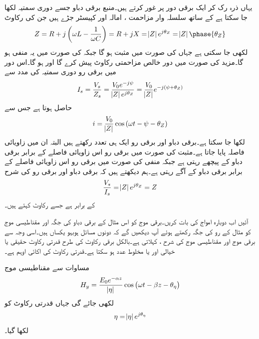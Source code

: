 یہاں ذرہ رک کر ایک برقی دور پر غور کرتے ہیں۔منبع برقی دباو  جسے دوری سمتیہ  لکھا جا سکتا ہے کے ساتھ سلسلہ وار مزاحمت ، امالہ  اور کپیسٹر  جڑے ہیں جن کی رکاوٹ 
\begin{align*}
Z=R+j\left( \omega L -\frac{1}{\omega C}\right)=R+jX=\abs{Z} e^{j \theta_Z}=\abs{Z}\phase{\theta_Z}
\end{align*}
لکھی جا سکتی ہے  جہاں  کی صورت میں  مثبت ہو گا جبکہ  کی صورت میں یہ منفی ہو گا۔مزید  کی صورت میں دور خالص مزاحمتی رکاوٹ پیش کرے گا اور  ہو گا۔اس دور میں برقی رو دوری سمتیہ کی مدد سے
\begin{align*}
I_s=\frac{V_s}{Z_s}=\frac{V_0 e^{-j\psi}}{\abs{Z}e^{j \theta_Z}}=\frac{V_0}{\abs{Z}}e^{-j(\psi+\theta_Z)}
\end{align*}
حاصل ہوتا ہے جس سے
\begin{align*}
i=\frac{V_0}{\abs{Z}}\cos \left(\omega t -\psi-\theta_Z \right)
\end{align*}
لکھا جا سکتا ہے۔برقی دباو اور برقی رو ایک ہی تعدد رکھتے ہیں البتہ ان میں زاویائی فاصلہ  پایا جاتا ہے۔مثبت  کی صورت میں برقی رو اس زاویائی فاصلے کے برابر برقی دباو کے پیچھے رہتی ہے جبکہ منفی  کی صورت میں برقی رو اس زاویائی فاصلے کے برابر برقی دباو کے آگے رہتی ہے۔ہم دیکھتے ہیں کہ برقی دباو اور برقی رو کی شرح
\begin{align*}
\frac{V_s}{I_s}=\abs{Z} e^{j \theta_Z}=Z
\end{align*}
کے برابر ہے جسے رکاوٹ کہتے ہیں۔

آئیں اب دوبارہ امواج کی بات کریں۔برقی موج کو اس مثال کے برقی دباو کی جگہ اور مقناطیسی موج کو مثال کے رو کی جگہ رکھتے ہوئے آپ دیکھیں گے کہ دونوں مسائل ہوبہو یکساں ہیں۔اسی وجہ سے  برقی موج  اور مقناطیسی موج  کی شرح ،   کہلاتی ہے۔بالکل برقی رکاوٹ کی طرح قدرتی رکاوٹ حقیقی یا خیالی اور یا مخلوط عدد ہو سکتا ہے۔قدرتی رکاوٹ کی اکائی اوہم  ہے۔

مساوات  سے مقناطیسی موج
\begin{align}\label{مساوات_موج_عمومی_مقناطیسی}
H_y=\frac{E_0 e^{-\alpha z}}{\abs{\eta}} \cos \left(\omega t - \beta z -\theta_{\eta} \right)
\end{align}
لکھی جائے گی جہاں قدرتی رکاوٹ کو
\begin{align}
\eta=\abs{\eta} e^{j \theta_{\eta}}
\end{align}
لکھا گیا۔

